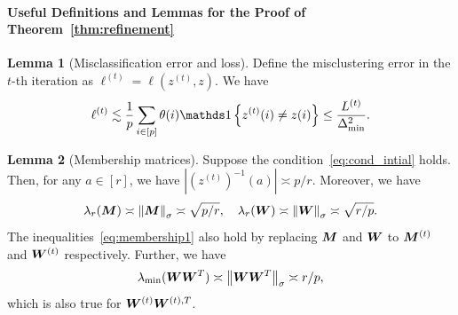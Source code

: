 \documentclass[lettersize,onecolumn,journal]{IEEEtran}
\theoremstyle{definition}
\newtheorem{lem}{Lemma}
\theoremstyle{definition}
\newcommand{\of}[1]{\left(#1\right)}
\newcommand{\offf}[1]{\left\{#1\right\}}
\begin{document}




\paragraph{Useful Definitions and Lemmas for the Proof of Theorem~\ref{thm:refinement}} 


\begin{lem}[Misclassification error and loss]\label{lem:mis} Define the misclustering error in the $t$-th iteration as $\ell^{(t)} = \ell(z^{(t)}, z)$. We have 
\begin{equation}
    \ell^{(t)} \lesssim \frac{1}{p}\sum_{i \in [p]} \theta(i) \ind\offf{ z^{(t)}(i) \neq z(i) } \leq \frac{L^{(t)}}{\Delta_{\min}^2}.
\end{equation}
\end{lem}

\begin{lem}[Membership matrices]\label{lem:membership} Suppose the condition~\eqref{eq:cond_intial} holds. Then, for any $a \in [r]$, we have $|\of{z^{(t)}}^{-1}(a)| \asymp p/r$. Moreover, we have 
\begin{equation}\label{eq:membership1}
    \lambda_{r}(\mM) \asymp \onorm{\mM}_{\sigma} \asymp \sqrt{p/r}, \quad  \lambda_{r}(\mW) \asymp \onorm{\mW}_{\sigma} \asymp \sqrt{r/p}.
\end{equation}
The inequalities~\eqref{eq:membership1} also hold by replacing $\bm M$ and $\bm{W}$ to $\bm M^{(t)}$ and $\bm{W}^{(t)}$ respectively. 
Further, we have 
\begin{equation}\label{eq:WWsingular}
   \lambda_{\min}(\mW\mW^T) \asymp \onorm{\mW\mW^T}_{\sigma} \asymp r/p,
\end{equation}
which is also true for $\bm{W}^{(t)}\bm{W}^{(t),T}$.
\end{lem}
\end{document}
